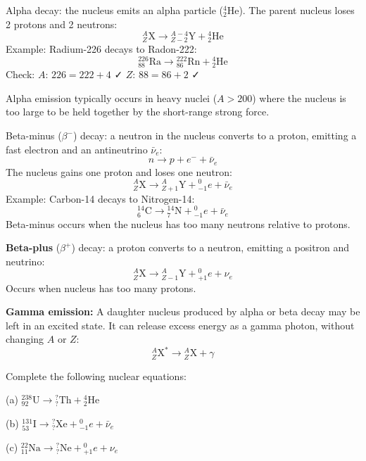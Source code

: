 \begin{definitionbox}
Alpha decay: the nucleus emits an alpha particle
(${}^4_2\text{He}$). The parent nucleus loses 2
protons and 2 neutrons:
\[
  {}^A_Z\text{X} \rightarrow {}^{A-4}_{Z-2}\text{Y}
  + {}^4_2\text{He}
\]
Example: Radium-226 decays to Radon-222:
\[
  {}^{226}_{88}\text{Ra} \rightarrow
  {}^{222}_{86}\text{Rn} + {}^{4}_{2}\text{He}
\]
Check: $A$: $226 = 222 + 4$ ✓ \quad $Z$: $88 = 86 + 2$ ✓

Alpha emission typically occurs in heavy nuclei
($A > 200$) where the nucleus is too large to be
held together by the short-range strong force.
\end{definitionbox}

\begin{definitionbox}
Beta-minus ($\beta^-$) decay: a neutron in the nucleus
converts to a proton, emitting a fast electron and an
antineutrino $\bar{\nu}_e$:
\[
  n \rightarrow p + e^- + \bar{\nu}_e
\]
The nucleus gains one proton and loses one neutron:
\[
  {}^A_Z\text{X} \rightarrow {}^{A}_{Z+1}\text{Y}
  + {}^{0}_{-1}e + \bar{\nu}_e
\]
Example: Carbon-14 decays to Nitrogen-14:
\[
  {}^{14}_{6}\text{C} \rightarrow
  {}^{14}_{7}\text{N} + {}^{0}_{-1}e + \bar{\nu}_e
\]
Beta-minus occurs when the nucleus has too many
neutrons relative to protons.
\end{definitionbox}

\begin{definitionbox}
\textbf{Beta-plus} ($\beta^+$) decay: a proton converts
to a neutron, emitting a positron and neutrino:
\[
  {}^A_Z\text{X} \rightarrow {}^{A}_{Z-1}\text{Y}
  + {}^{0}_{+1}e + \nu_e
\]
Occurs when nucleus has too many protons.

\textbf{Gamma emission:} A daughter nucleus produced by
alpha or beta decay may be left in an excited state. It
can release excess energy as a gamma photon, without
changing $A$ or $Z$:
\[
  {}^A_Z\text{X}^* \rightarrow {}^A_Z\text{X} + \gamma
\]
\end{definitionbox}

\begin{examplebox}[28.1]
Complete the following nuclear equations:

(a) ${}^{238}_{92}\text{U} \rightarrow {}^{?}_{?}\text{Th}
+ {}^{4}_{2}\text{He}$

(b) ${}^{131}_{53}\text{I} \rightarrow {}^{?}_{?}\text{Xe}
+ {}^{0}_{-1}e + \bar{\nu}_e$

(c) ${}^{22}_{11}\text{Na} \rightarrow {}^{?}_{?}\text{Ne}
+ {}^{0}_{+1}e + \nu_e$
\end{examplebox}

